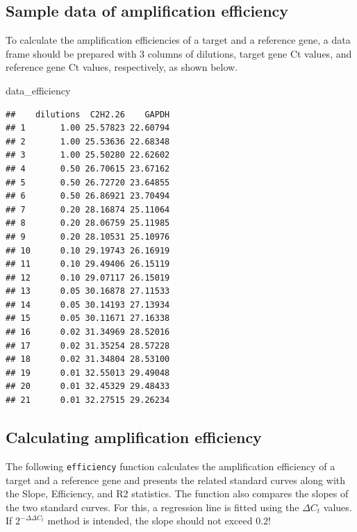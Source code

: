 \documentclass[
]{article}
\newenvironment{Shaded}{\begin{snugshade}}{\end{snugshade}}
\newcommand{\NormalTok}[1]{#1}
\begin{document}
\hypertarget{sample-data-of-amplification-efficiency}{%
\subsection{Sample data of amplification
efficiency}\label{sample-data-of-amplification-efficiency}}

To calculate the amplification efficiencies of a target and a reference
gene, a data frame should be prepared with 3 columns of dilutions,
target gene Ct values, and reference gene Ct values, respectively, as
shown below.

\begin{Shaded}
\begin{Highlighting}[]
\NormalTok{data\_efficiency}
\end{Highlighting}
\end{Shaded}

\begin{verbatim}
##    dilutions  C2H2.26    GAPDH
## 1       1.00 25.57823 22.60794
## 2       1.00 25.53636 22.68348
## 3       1.00 25.50280 22.62602
## 4       0.50 26.70615 23.67162
## 5       0.50 26.72720 23.64855
## 6       0.50 26.86921 23.70494
## 7       0.20 28.16874 25.11064
## 8       0.20 28.06759 25.11985
## 9       0.20 28.10531 25.10976
## 10      0.10 29.19743 26.16919
## 11      0.10 29.49406 26.15119
## 12      0.10 29.07117 26.15019
## 13      0.05 30.16878 27.11533
## 14      0.05 30.14193 27.13934
## 15      0.05 30.11671 27.16338
## 16      0.02 31.34969 28.52016
## 17      0.02 31.35254 28.57228
## 18      0.02 31.34804 28.53100
## 19      0.01 32.55013 29.49048
## 20      0.01 32.45329 29.48433
## 21      0.01 32.27515 29.26234
\end{verbatim}

\hypertarget{calculating-amplification-efficiency}{%
\subsection{Calculating amplification
efficiency}\label{calculating-amplification-efficiency}}

The following \texttt{efficiency} function calculates the amplification
efficiency of a target and a reference gene and presents the related
standard curves along with the Slope, Efficiency, and R2 statistics. The
function also compares the slopes of the two standard curves. For this,
a regression line is fitted using the \(\Delta C_t\) values. If
\(2^{-\Delta\Delta C_t}\) method is intended, the slope should not
exceed 0.2!
\end{document}

